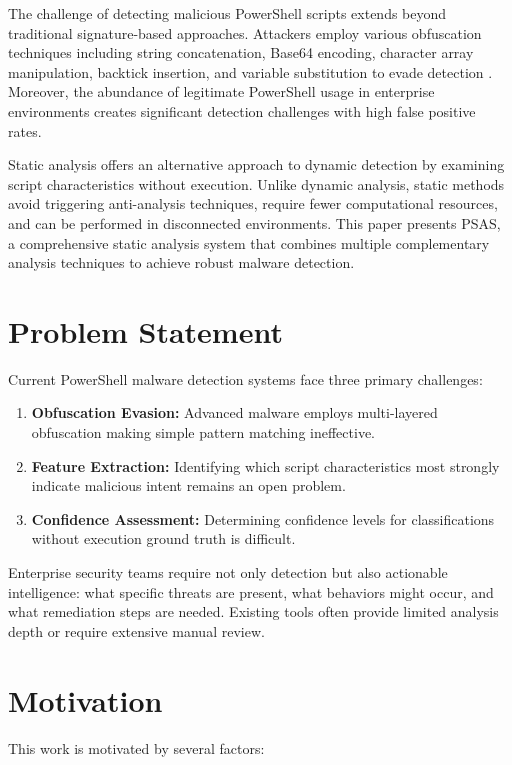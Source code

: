 \documentclass[10pt,conference,a4paper]{IEEEtran}
\begin{document}
The challenge of detecting malicious PowerShell scripts extends beyond traditional signature-based approaches. Attackers employ various obfuscation techniques including string concatenation, Base64 encoding, character array manipulation, backtick insertion, and variable substitution to evade detection \cite{ref3}. Moreover, the abundance of legitimate PowerShell usage in enterprise environments creates significant detection challenges with high false positive rates.

Static analysis offers an alternative approach to dynamic detection by examining script characteristics without execution. Unlike dynamic analysis, static methods avoid triggering anti-analysis techniques, require fewer computational resources, and can be performed in disconnected environments. This paper presents PSAS, a comprehensive static analysis system that combines multiple complementary analysis techniques to achieve robust malware detection.

\section{Problem Statement}

Current PowerShell malware detection systems face three primary challenges:

\begin{enumerate}
\item \textbf{Obfuscation Evasion:} Advanced malware employs multi-layered obfuscation making simple pattern matching ineffective.
\item \textbf{Feature Extraction:} Identifying which script characteristics most strongly indicate malicious intent remains an open problem.
\item \textbf{Confidence Assessment:} Determining confidence levels for classifications without execution ground truth is difficult.
\end{enumerate}

Enterprise security teams require not only detection but also actionable intelligence: what specific threats are present, what behaviors might occur, and what remediation steps are needed. Existing tools often provide limited analysis depth or require extensive manual review.

\section{Motivation}

This work is motivated by several factors:
\end{document}
